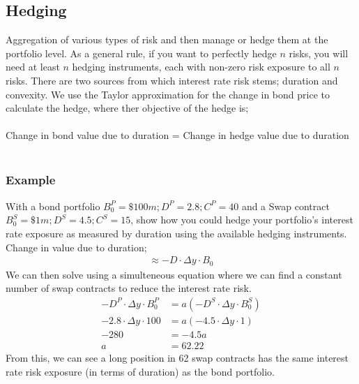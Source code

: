 \documentclass[a4paper]{article}
\begin{document}
\subsection{Hedging}
Aggregation of various types of risk and then manage or hedge them at the portfolio
level. As a general rule, if you want to perfectly hedge $n$ risks, you will
need at least $n$ hedging instruments, each with non-zero risk exposure to all
$n$ risks. There are two sources from which interest rate risk stems; duration
and convexity. We use the Taylor approximation for the change in bond price
to calculate the hedge, where ther objective of the hedge is;\\\\
%
%
Change in bond value due to duration = Change in hedge value due to duration\\\\
\subsubsection{Example}
With a bond portfolio $B_0^P = \$100m; D^P = 2.8; C^P = 40$ and a Swap contract
$B_0^S = \$1m; D^S = 4.5; C^S = 15$, show how you could hedge your portfolio's
interest rate exposure as measured by duration using the available hedging
instruments.
Change in value due to duration;
\begin{align*}
\approx -D \cdot \Delta y \cdot B_0
\end{align*}
We can then solve using a simulteneous equation where we can find a constant
number of swap contracts to reduce the interest rate risk.
\begin{align*}
-D^P \cdot \Delta y \cdot B_0^P &= a(-D^S \cdot \Delta y \cdot B_0^S)\\
-2.8 \cdot \Delta y \cdot 100 &= a(-4.5\cdot \Delta y \cdot 1)\\
-280 &= -4.5a \\
a &= 62.22
\end{align*}
From this, we can see a long position in 62 swap contracts has the same interest
rate risk exposure (in terms of duration) as the bond portfolio.
\end{document}
